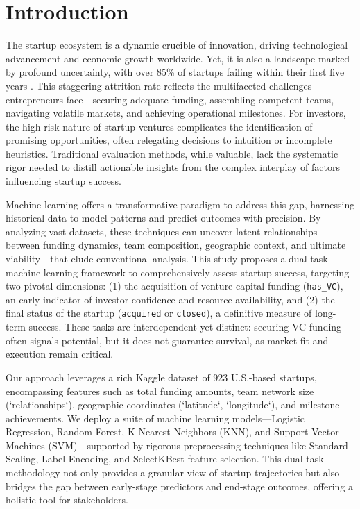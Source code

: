 \documentclass[conference]{IEEEtran}
\begin{document}
\IEEEpeerreviewmaketitle

\section{Introduction}
    The startup ecosystem is a dynamic crucible of innovation, driving technological advancement and economic growth worldwide. Yet, it is also a landscape marked by profound uncertainty, with over 85\% of startups failing within their first five years \cite{startupgenome}. This staggering attrition rate reflects the multifaceted challenges entrepreneurs face—securing adequate funding, assembling competent teams, navigating volatile markets, and achieving operational milestones. For investors, the high-risk nature of startup ventures complicates the identification of promising opportunities, often relegating decisions to intuition or incomplete heuristics. Traditional evaluation methods, while valuable, lack the systematic rigor needed to distill actionable insights from the complex interplay of factors influencing startup success.

    Machine learning offers a transformative paradigm to address this gap, harnessing historical data to model patterns and predict outcomes with precision. By analyzing vast datasets, these techniques can uncover latent relationships—between funding dynamics, team composition, geographic context, and ultimate viability—that elude conventional analysis. This study proposes a dual-task machine learning framework to comprehensively assess startup success, targeting two pivotal dimensions: (1) the acquisition of venture capital funding (\texttt{has\_VC}), an early indicator of investor confidence and resource availability, and (2) the final status of the startup (\texttt{acquired} or \texttt{closed}), a definitive measure of long-term success. These tasks are interdependent yet distinct: securing VC funding often signals potential, but it does not guarantee survival, as market fit and execution remain critical.

    Our approach leverages a rich Kaggle dataset of 923 U.S.-based startups, encompassing features such as total funding amounts, team network size (`relationships`), geographic coordinates (`latitude`, `longitude`), and milestone achievements. We deploy a suite of machine learning models—Logistic Regression, Random Forest, K-Nearest Neighbors (KNN), and Support Vector Machines (SVM)—supported by rigorous preprocessing techniques like Standard Scaling, Label Encoding, and SelectKBest feature selection. This dual-task methodology not only provides a granular view of startup trajectories but also bridges the gap between early-stage predictors and end-stage outcomes, offering a holistic tool for stakeholders.
\end{document}
